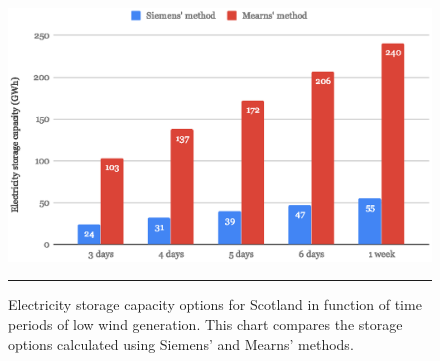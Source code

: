 \begin{figure}[htbp]
	\centering
	\includegraphics[width=\textwidth]{figures/storage_options_compared.eps}
	\rule{\textwidth}{0.5pt} %
	\caption{Electricity storage capacity options for Scotland in function of time periods of low wind generation. This chart compares the storage options calculated using Siemens' and Mearns' methods.}
	\label{fig:storage_options_compared}
\end{figure}